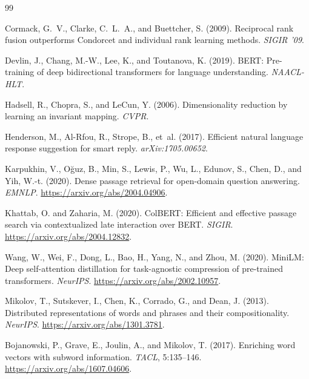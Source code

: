 \documentclass[12pt, a4paper]{article}
\begin{document}
\begin{thebibliography}{99}

Cormack, G.~V., Clarke, C.~L.~A., and Buettcher, S. (2009).
Reciprocal rank fusion outperforms Condorcet and individual rank learning
methods.
\textit{SIGIR '09}.

Devlin, J., Chang, M.-W., Lee, K., and Toutanova, K. (2019).
BERT: Pre-training of deep bidirectional transformers for language
understanding.
\textit{NAACL-HLT}.

Hadsell, R., Chopra, S., and LeCun, Y. (2006).
Dimensionality reduction by learning an invariant mapping.
\textit{CVPR}.

Henderson, M., Al-Rfou, R., Strope, B., et~al. (2017).
Efficient natural language response suggestion for smart reply.
\textit{arXiv:1705.00652}.

Karpukhin, V., O\u{g}uz, B., Min, S., Lewis, P., Wu, L., Edunov, S.,
Chen, D., and Yih, W.-t. (2020).
Dense passage retrieval for open-domain question answering.
\textit{EMNLP}. \url{https://arxiv.org/abs/2004.04906}.

Khattab, O. and Zaharia, M. (2020).
ColBERT: Efficient and effective passage search via contextualized late
interaction over BERT.
\textit{SIGIR}. \url{https://arxiv.org/abs/2004.12832}.

Wang, W., Wei, F., Dong, L., Bao, H., Yang, N., and Zhou, M. (2020).
MiniLM: Deep self-attention distillation for task-agnostic compression of
pre-trained transformers.
\textit{NeurIPS}. \url{https://arxiv.org/abs/2002.10957}.

Mikolov, T., Sutskever, I., Chen, K., Corrado, G., and Dean, J. (2013).
Distributed representations of words and phrases and their compositionality.
\textit{NeurIPS}. \url{https://arxiv.org/abs/1301.3781}.

Bojanowski, P., Grave, E., Joulin, A., and Mikolov, T. (2017).
Enriching word vectors with subword information.
\textit{TACL}, 5:135--146. \url{https://arxiv.org/abs/1607.04606}.


\end{thebibliography}
\end{document}
